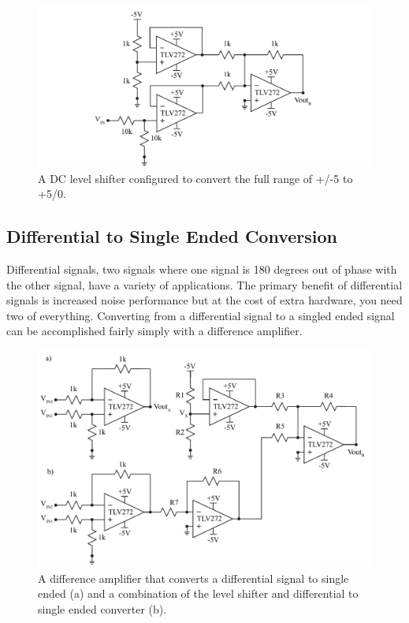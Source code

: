 \begin{figure} [h]
	\centering
		\includegraphics[width=1\textwidth]{Lab6fullshift.pdf}
	\caption{A DC level shifter configured to convert the full range of +/-5 to +5/0.} \label{fig:6fullshift}
\end{figure}

\newpage

\subsection{Differential to Single Ended Conversion} \label{ssec:6diff2single}

Differential signals, two signals where one signal is 180 degrees out of phase with the other signal, have a variety of applications. The primary benefit of differential signals is increased noise performance but at the cost of extra hardware, you need two of everything. Converting from a differential signal to a singled ended signal can be accomplished fairly simply with a difference amplifier. 

\begin{figure} [h]
	\centering
		\includegraphics[width=1\textwidth]{Lab6difftosingle.pdf}
	\caption{A difference amplifier that converts a differential signal to single ended (a) and a combination of the level shifter and differential to single ended converter (b).} \label{fig:6difftosingle}
\end{figure}

